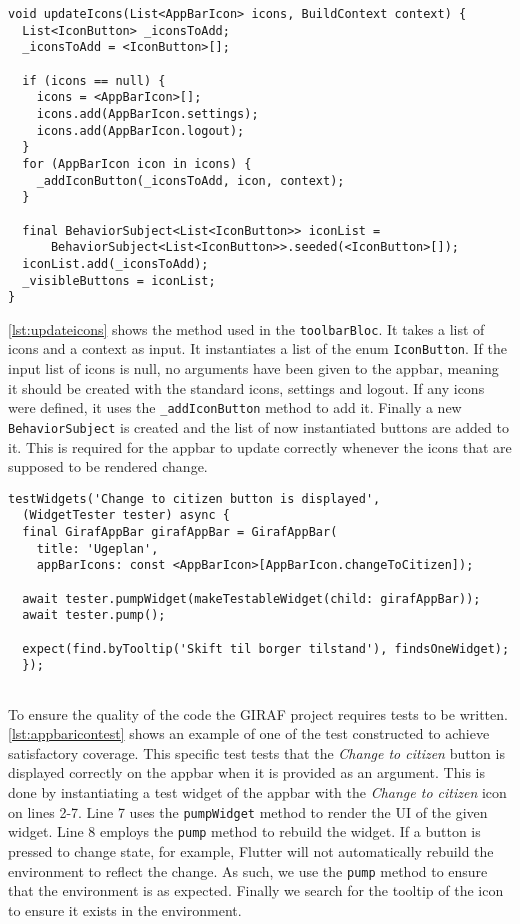 \begin{lstlisting}[caption={Updating the icons in the appbar},label={lst:updateicons}]
  void updateIcons(List<AppBarIcon> icons, BuildContext context) {
  List<IconButton> _iconsToAdd;
  _iconsToAdd = <IconButton>[];

  if (icons == null) {
    icons = <AppBarIcon>[];
    icons.add(AppBarIcon.settings);
    icons.add(AppBarIcon.logout);
  }
  for (AppBarIcon icon in icons) {
    _addIconButton(_iconsToAdd, icon, context);
  }

  final BehaviorSubject<List<IconButton>> iconList =
      BehaviorSubject<List<IconButton>>.seeded(<IconButton>[]);
  iconList.add(_iconsToAdd);
  _visibleButtons = iconList;
}
\end{lstlisting}
\autoref{lst:updateicons} shows the method used in the \texttt{toolbarBloc}.
It takes a list of icons and a context as input.
It instantiates a list of the enum \texttt{IconButton}.
If the input list of icons is null, no arguments have been given to the appbar, meaning it should be created with the standard icons, settings and logout.
If any icons were defined, it uses the \texttt{\_addIconButton} method to add it.
Finally a new \texttt{BehaviorSubject} is created and the list of now instantiated buttons are added to it.
This is required for the appbar to update correctly whenever the icons that are supposed to be rendered change.

\begin{lstlisting}[caption={Testing the appbar with certain icons},label={lst:appbaricontest}]
  testWidgets('Change to citizen button is displayed',
  (WidgetTester tester) async {
  final GirafAppBar girafAppBar = GirafAppBar(
    title: 'Ugeplan',
    appBarIcons: const <AppBarIcon>[AppBarIcon.changeToCitizen]);
  
  await tester.pumpWidget(makeTestableWidget(child: girafAppBar));
  await tester.pump();
  
  expect(find.byTooltip('Skift til borger tilstand'), findsOneWidget);
  });
  
\end{lstlisting}
To ensure the quality of the code the GIRAF project requires tests to be written.
\autoref{lst:appbaricontest} shows an example of one of the test constructed to achieve satisfactory coverage.
This specific test tests that the \textit{Change to citizen} button is displayed correctly on the appbar when it is provided as an argument.
This is done by instantiating a test widget of the appbar with the \textit{Change to citizen} icon on lines 2-7.
Line 7 uses the \texttt{pumpWidget} method to render the UI of the given widget.
Line 8 employs the \texttt{pump} method to rebuild the widget.
If a button is pressed to change state, for example, Flutter will not automatically rebuild the environment to reflect the change.
As such, we use the \texttt{pump} method to ensure that the environment is as expected.
Finally we search for the tooltip of the icon to ensure it exists in the environment.

